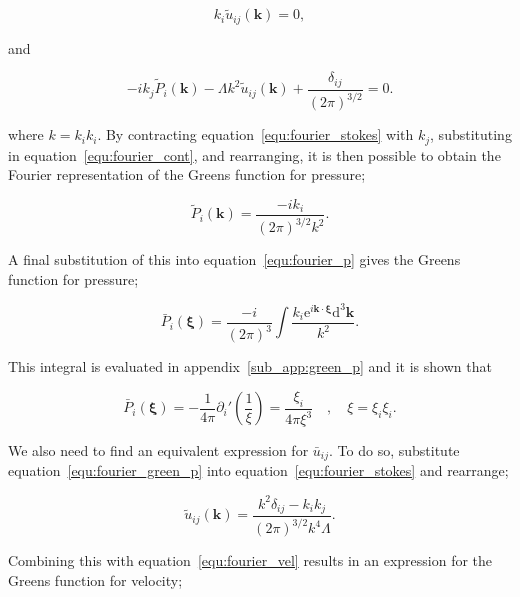 \documentclass[12pt]{article}
\begin{document}
\begin{equation}
\label{equ:fourier_cont}
k_{i} \tilde{u}_{ij} (\boldsymbol{k}) = 0 ,
\end{equation}

and

\begin{equation}
\label{equ:fourier_stokes}
-i k_{j} \tilde{P}_{i} (\boldsymbol{k}) - \Lambda k^{2} \tilde{u}_{ij} (\boldsymbol{k}) + \frac{\delta_{ij}}{(2 \pi)^{3/2}} = 0 .
\end{equation}

where $k = k_{i} k_{i}$. By contracting equation~\ref{equ:fourier_stokes} with $k_{j}$, substituting in equation~\ref{equ:fourier_cont}, and rearranging, it is then possible to obtain the Fourier representation of the Greens function for pressure;

\begin{equation}
\label{equ:fourier_green_p}
\tilde{P}_{i} (\boldsymbol{k}) = \frac{-i k_{i}}{(2 \pi)^{3/2} k^{2}}.
\end{equation}

A final substitution of this into equation~\ref{equ:fourier_p} gives the Greens function for pressure;

\begin{equation}
\label{equ:green_p_int}
\bar{P}_{i} (\boldsymbol\xi) = \frac{-i}{(2 \pi)^{3}} \int \frac{k_{i} \mathrm{e}^{i \boldsymbol{k} \cdot \boldsymbol{\xi}} \mathrm{d}^{3} \boldsymbol{k}}{k^{2}} .
\end{equation}

This integral is evaluated in appendix~\ref{sub_app:green_p} and it is shown that

\begin{equation}
\label{equ:green_p}
\bar{P}_{i} (\boldsymbol\xi) = -\frac{1}{4 \pi} \partial_{i}' \left(\frac{1}{\xi}\right) = \frac{\xi_{i}}{4 \pi \xi^{3}} \quad , \quad \xi = \xi_{i} \xi_{i} .
\end{equation}

We also need to find an equivalent expression for $\bar{u}_{ij}$. To do so, substitute equation~\ref{equ:fourier_green_p} into equation~\ref{equ:fourier_stokes} and rearrange;

\begin{equation}
\label{equ:fourier_green_u}
\tilde{u}_{ij} (\boldsymbol{k}) = \frac{k^{2} \delta_{ij} - k_{i} k_{j}}{(2 \pi)^{3/2} k^{4} \Lambda} .
\end{equation}

Combining this with equation~\ref{equ:fourier_vel} results in an expression for the Greens function for velocity;
\end{document}
